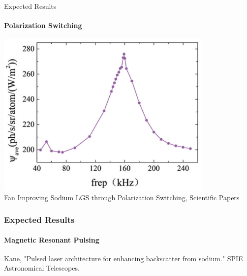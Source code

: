 \documentclass{beamer}
\begin{document}
\begin{frame}{Expected Results}
  \framesubtitle{Polarization Switching}
  \centering
  \includegraphics[width=0.8\textwidth]{../Thesis/FullPaper/Images/polarizationswitch.png}
\vspace{-.3cm}
{\\\tiny Fan Improving Sodium LGS through Polarization Switching, Scientific Papers}
\end{frame}

\begin{frame}
  \frametitle{Expected Results}
  \framesubtitle{Magnetic Resonant Pulsing}
  \begin{center}
\end{center}
\vspace{-.5cm}
{\tiny Kane, "Pulsed laser architecture for enhancing backscatter from sodium." SPIE Astronomical Telescopes.}
\end{frame}
\end{document}
